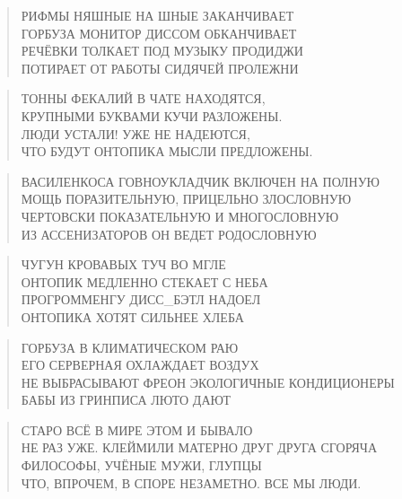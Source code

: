 \poemtitle{***}
\begin{verse}
РИФМЫ НЯШНЫЕ НА ШНЫЕ ЗАКАНЧИВАЕТ\\
ГОРБУЗА МОНИТОР ДИССОМ ОБКАНЧИВАЕТ\\
РЕЧЁВКИ ТОЛКАЕТ ПОД МУЗЫКУ ПРОДИДЖИ\\
ПОТИРАЕТ ОТ РАБОТЫ СИДЯЧЕЙ ПРОЛЕЖНИ
\end{verse}

\poemtitle{***}
\begin{verse}
ТОННЫ ФЕКАЛИЙ В ЧАТЕ НАХОДЯТСЯ,\\
КРУПНЫМИ БУКВАМИ КУЧИ РАЗЛОЖЕНЫ.\\
ЛЮДИ УСТАЛИ! УЖЕ НЕ НАДЕЮТСЯ,\\
ЧТО БУДУТ ОНТОПИКА МЫСЛИ ПРЕДЛОЖЕНЫ.
\end{verse}

\poemtitle{***}
\begin{verse}
ВАСИЛЕНКОСА ГОВНОУКЛАДЧИК ВКЛЮЧЕН НА ПОЛНУЮ\\
МОЩЬ ПОРАЗИТЕЛЬНУЮ, ПРИЦЕЛЬНО ЗЛОСЛОВНУЮ\\
ЧЕРТОВСКИ ПОКАЗАТЕЛЬНУЮ И МНОГОСЛОВНУЮ\\
ИЗ АССЕНИЗАТОРОВ ОН ВЕДЕТ РОДОСЛОВНУЮ
\end{verse}

\poemtitle{***}
\begin{verse}
ЧУГУН КРОВАВЫХ ТУЧ ВО МГЛЕ\\
ОНТОПИК МЕДЛЕННО СТЕКАЕТ С НЕБА\\
ПРОГРОММЕНГУ ДИСС\_БЭТЛ НАДОЕЛ\\
ОНТОПИКА ХОТЯТ СИЛЬНЕЕ ХЛЕБА
\end{verse}

\poemtitle{***}
\begin{verse}
ГОРБУЗА В КЛИМАТИЧЕСКОМ РАЮ\\
ЕГО СЕРВЕРНАЯ ОХЛАЖДАЕТ ВОЗДУХ\\
НЕ ВЫБРАСЫВАЮТ ФРЕОН ЭКОЛОГИЧНЫЕ КОНДИЦИОНЕРЫ\\
БАБЫ ИЗ ГРИНПИСА ЛЮТО ДАЮТ
\end{verse}

\poemtitle{***}
\begin{verse}
СТАРО ВСЁ В МИРЕ ЭТОМ И БЫВАЛО\\
НЕ РАЗ УЖЕ. КЛЕЙМИЛИ МАТЕРНО ДРУГ ДРУГА СГОРЯЧА\\
ФИЛОСОФЫ, УЧЁНЫЕ МУЖИ, ГЛУПЦЫ\\
ЧТО, ВПРОЧЕМ, В СПОРЕ НЕЗАМЕТНО. ВСЕ МЫ ЛЮДИ.
\end{verse}


